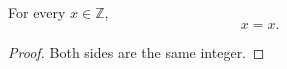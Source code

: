 \documentclass{article}
\begin{document}
\begin{theorem}\label{anchor:reflexivity}
For every $x\in\mathbb{Z}$, \[x=x.\]
\end{theorem}
\begin{proof}Both sides are the same integer.\end{proof}
\end{document}

